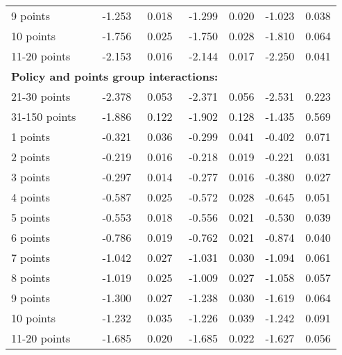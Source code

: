\begin{table}
\begin{tabular}{l r r r r r r}
9 points  & -1.253  &  0.018  & -1.299  &  0.020  & -1.023  &  0.038   \\ 
 
10 points  & -1.756  &  0.025  & -1.750  &  0.028  & -1.810  &  0.064   \\ 
 
11-20 points  & -2.153  &  0.016  & -2.144  &  0.017  & -2.250  &  0.041   \\ 
 

\hline 
 
\multicolumn{4}{l}{\textbf{Policy and points group interactions:}}  \\ 
 
21-30 points  & -2.378  &  0.053  & -2.371  &  0.056  & -2.531  &  0.223   \\ 
 
31-150 points  & -1.886  &  0.122  & -1.902  &  0.128  & -1.435  &  0.569   \\ 
 
1 points  & -0.321  &  0.036  & -0.299  &  0.041  & -0.402  &  0.071   \\ 
 
2 points  & -0.219  &  0.016  & -0.218  &  0.019  & -0.221  &  0.031   \\ 
 
3 points  & -0.297  &  0.014  & -0.277  &  0.016  & -0.380  &  0.027   \\ 
 
4 points  & -0.587  &  0.025  & -0.572  &  0.028  & -0.645  &  0.051   \\ 
 
5 points  & -0.553  &  0.018  & -0.556  &  0.021  & -0.530  &  0.039   \\ 
 
6 points  & -0.786  &  0.019  & -0.762  &  0.021  & -0.874  &  0.040   \\ 
 
7 points  & -1.042  &  0.027  & -1.031  &  0.030  & -1.094  &  0.061   \\ 
 
8 points  & -1.019  &  0.025  & -1.009  &  0.027  & -1.058  &  0.057   \\ 
 
9 points  & -1.300  &  0.027  & -1.238  &  0.030  & -1.619  &  0.064   \\ 
 
10 points  & -1.232  &  0.035  & -1.226  &  0.039  & -1.242  &  0.091   \\ 
 
11-20 points  & -1.685  &  0.020  & -1.685  &  0.022  & -1.627  &  0.056   \\ 
 

\end{tabular}
\end{table}
